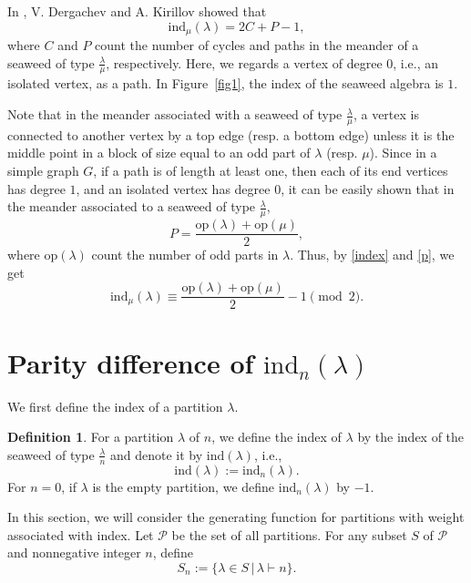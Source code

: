 \documentclass[reqno]{amsart}
\theoremstyle{definition}
\newtheorem{defn}{Definition}%
\newcommand{\ind}{\mathrm{ind}}
\newcommand{\op}{\mathrm{op}}
\newcommand{\pa}{\mathcal{P}}
\newcommand{\lam}{\lambda}
\begin{document}
In \cite{dergachevkirillov}, V. Dergachev and A. Kirillov showed that
\begin{equation}
\ind_{\mu}(\lam)=2C+P-1, \label{index}
\end{equation}
where $C$ and $P$ count the number of cycles and paths in the meander of a seaweed of type $\frac{\lambda}{\mu}$, respectively.  Here, we regards a vertex  of degree $0$, i.e., an isolated vertex, as a path.  
In Figure~\ref{fig1}, the index of the seaweed algebra  is $1$. 

Note that in the meander associated with a seaweed of type $\frac{\lambda}{\mu}$, a vertex is connected to another vertex by a top edge (resp. a bottom edge) unless it is the middle point in a block of size equal to an odd part of $\lambda$ (resp. $\mu$). Since in a simple graph $G$, if a path is of length at least one, then each of its end vertices has degree $1$, and an isolated vertex has degree $0$,  it can be easily shown that in the meander associated to a seaweed of type $\frac{\lambda}{\mu}$, 
\begin{equation}
P=\frac{\op(\lambda)+\op(\mu)}{2},  \label{p}
\end{equation}  
where $\op(\lam)$ count the number of odd parts in $\lam$. Thus, by \eqref{index} and \eqref{p}, we get
\begin{equation}
\ind_{\mu}(\lam)\equiv \frac{\op(\lam)+\op(\mu)}{2}-1 \pmod{2}. \label{eq1}
\end{equation}


\section{Parity difference of $\ind_n(\lam)$}\label{sec3}

We first define the index of a partition $\lambda$. 
\begin{defn} 
For a partition $\lambda$ of $n$, we define the index of $\lambda$ by the index of the seaweed of type $\frac{\lambda}{n}$ and denote it by $\ind(\lambda)$, i.e.,
\begin{equation*}
\ind(\lambda):=\ind_n(\lambda).
\end{equation*}
For $n=0$, if $\lambda$ is the empty partition, we define $\ind_n(\lambda)$ by $-1$. 
\end{defn}

In this section, we will consider the generating function for partitions with weight associated with index.  Let $\pa$ be the set of all partitions. For any subset $S$ of  $\pa$ and nonnegative integer $n$, define
$$
S_n := \{ \lam \in S \,|\,  \lam \vdash n \}.
$$
\end{document}
